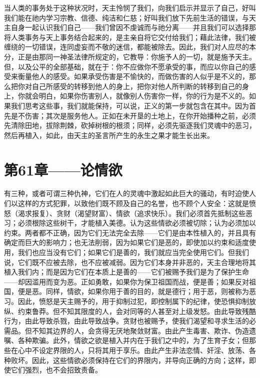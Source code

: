 当人类的事务处于这种状况时，天主怜悯了我们，向我们启示并显示了自己，好叫我们能在祂内学习宗教、信德、纯洁和仁慈；好叫我们放下先前生活的错误，与天主自身一起认识我们自己——我们曾因不虔诚而与祂分离——并且我们可以选择那将人类事务与天上事务结合起来的，是主亲自将它交付给我们；藉此法律，我们被缠绕的一切错误，连同虚妄而不敬的迷信，都能被除去。因此，我们对人应尽的本分，正是由那同一神圣法律所规定的，它教导：你施予人的一切，就是施予天主。但，以及公平的全部基础，就在于：你不应做你不愿承受的事，而应以你自己的感受来衡量他人的感受。如果承受伤害是不愉快的，而做伤害的人似乎是不义的，那么把你对自己所感受的转移到他人的身上，把你对他人所判断的转移到自己的身上，你就会明白，如果你伤害别人，就像别人伤害你一样，你的行为是不义的。如果我们思考这些事，我们就能保持，可以说，正义的第一步就包含在其中。因为首先是不伤害；其次是服务他人。正如在未开垦的土地上，在你开始播种之前，必须先清除田地，拔除荆棘，砍掉树根的根须；同样，必须先驱逐我们灵魂中的恶习，然后再植入，如此，由天主的圣言所产生的永生之果才能生长出来。\par


\section{第61章——论情欲}

有三种，或者可谓三种仇神，它们在人的灵魂中激起如此巨大的骚动，有时迫使人们以这样的方式犯罪，以致他们既不顾及自己的名誉，也不顾个人安全：这就是愤怒（渴求报复）、贪财（渴望财富）、情欲（追求快乐）。我们必须首先抵制这些恶习；必须根除这些树干，才能植入美德。认为这些情欲必须被切除；认为必须加以约束。两者都不正确，因为它们无法完全去除——它们是由本性植入的，并且具有确定而巨大的影响力；也无法削弱，因为如果它们是恶的，即使加以约束和适度使用，我们也应当没有它们；如果它们是善的，我们就应当完全使用它们。但我们说，它们既不应被去除，也不应被减弱。因为它们本身并非恶的，天主合理地将其植入我们内；而是因为它们在本质上是善的——它们被赐予我们是为了保护生命——却因滥用而变为恶。正如勇敢，如果你为保卫祖国而战，便是善；如果反对祖国，便是恶。同样，情欲，如果你用于善的目的，就是德行；用于恶，则被称为恶习。因此，愤怒是天主赐予的，用于抑制过犯，即控制属下的纪律，使恐惧抑制放纵、约束鲁莽。但不知其限度的人，会对同等的人甚至对上级发怒。由此导致残酷行为，由此导致杀戮，由此导致战争。贪财也被赐予，使我们渴望和寻求生活的必需品。但不知其边界的人，会贪得无厌地聚敛财富。由此产生毒害、欺诈、伪造遗嘱、各种欺骗。此外，情欲之欲是植入并内在于我们之中的，为了生育子女；但那些在心中不设定界限的人，只将其用于享乐。由此产生非法恋情、奸淫、放荡、各种败坏。因此，这些情欲必须保持在它们的界限内，并导向正确的方向；这样，即使它们强烈，也不会招致责备。\par

